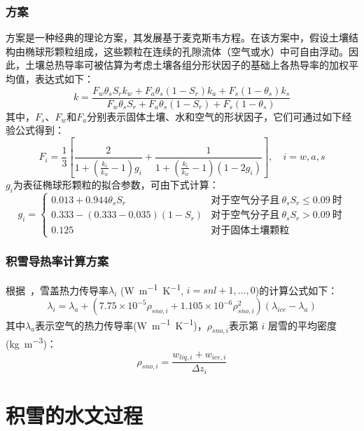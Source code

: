\subsubsection{\citet{de1963thermal}方案}
\citet{de1963thermal}方案是一种经典的理论方案，其发展基于麦克斯韦方程。在该方案中，假设土壤结构由椭球形颗粒组成，这些颗粒在连续的孔隙流体（空气或水）中可自由浮动。因此，土壤总热导率可被估算为考虑土壤各组分形状因子的基础上各热导率的加权平均值，表达式如下：$$k=\frac{F_w\theta_sS_rk_w+F_a\theta_s\left(1-S_r\right)k_a+F_s\left(1-\theta_s\right)k_s}{F_w\theta_sS_r+F_a\theta_s\left(1-S_r\right)+F_s\left(1-\theta_s\right)}$$
其中，$F_s$、$F_w$和$F_a$分别表示固体土壤、水和空气的形状因子，它们可通过如下经验公式得到：
\begin{equation}
F_i=\frac{1}{3}\left[\frac{2}{1+\left(\frac{k_i}{k_w}-1\right)g_i}+\frac{1}{1+\left(\frac{k_i}{k_w}-1\right)(1-2g_i)}\right],\quad i=w,a,s
\end{equation}
$g_i$为表征椭球形颗粒的拟合参数，可由下式计算：
\begin{equation}
g_i=\begin{cases}
0.013+0.944\theta_sS_r  & \text{对于空气分子且}\ \theta_sS_r\leqslant 0.09\ \text{时} \\ 
0.333-\left(0.333-0.035\right)\left(1-S_r\right) & \text{对于空气分子且}\ \theta_sS_r>0.09\ \text{时} \\
0.125 &\text{对于固体土壤颗粒}
\end{cases}
\end{equation}


\subsubsection{积雪导热率计算方案}
根据~\citet{jordan1991one}，雪盖热力传导率$\lambda_i$ (\unit{W.m^{-1}.K^{-1}}, $i=snl+1,\ldots,0$)的计算公式如下：
\begin{equation}
\lambda_{i}=\lambda_{a}+\left(7.75 \times 10^{-5} \rho_{sno, i}+1.105 \times 10^{-6} \rho_{sno, i}^{2}\right)\left(\lambda_{ice}-\lambda_{a}\right)
\end{equation}
其中$\lambda_a$表示空气的热力传导率(\unit{W.m^{-1}.K^{-1}})，$\rho_{sno,i}$表示第 $i$ 层雪的平均密度(\unit{kg.m^{-3}})：
\begin{equation}
\rho_{sno, i}=\frac{w_{liq, i}+w_{ice, i}}{\Delta z_{i}}
\end{equation}

\section{积雪的水文过程}

